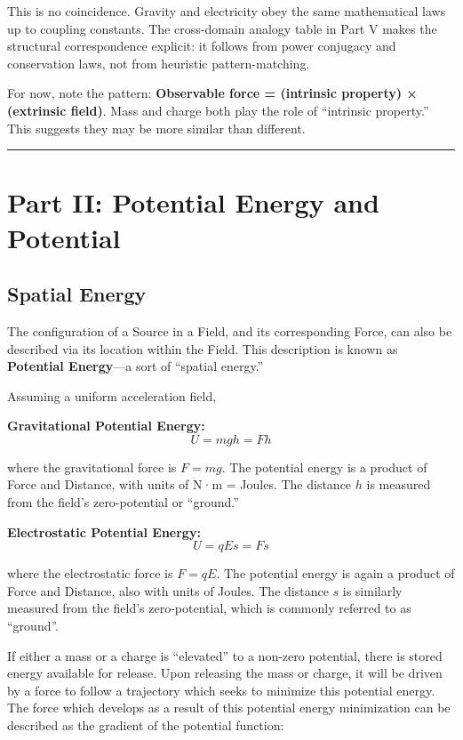 \documentclass[
  letterpaper,
  DIV=11,
  numbers=noendperiod]{scrartcl}
\begin{document}
This is no coincidence. Gravity and electricity obey the same
mathematical laws up to coupling constants. The cross-domain analogy
table in Part V makes the structural correspondence explicit: it follows
from power conjugacy and conservation laws, not from heuristic
pattern-matching.

For now, note the pattern: \textbf{Observable force = (intrinsic
property) × (extrinsic field)}. Mass and charge both play the role of
``intrinsic property.'' This suggests they may be more similar than
different.

\begin{center}\rule{0.5\linewidth}{0.5pt}\end{center}

\section{Part II: Potential Energy and
Potential}\label{part-ii-potential-energy-and-potential}

\subsection{Spatial Energy}\label{spatial-energy}

The configuration of a Source in a Field, and its corresponding Force,
can also be described via its location within the Field. This
description is known as \textbf{Potential Energy}---a sort of ``spatial
energy.''

Assuming a uniform acceleration field,

\textbf{Gravitational Potential Energy:} \[U = mgh = Fh\]

where the gravitational force is \(F = mg\). The potential energy is a
product of Force and Distance, with units of N·m = Joules. The distance
\(h\) is measured from the field's zero-potential or ``ground.''

\textbf{Electrostatic Potential Energy:} \[U = qEs = Fs\]

where the electrostatic force is \(F = qE\). The potential energy is
again a product of Force and Distance, also with units of Joules. The
distance \(s\) is similarly measured from the field's zero-potential,
which is commonly referred to as ``ground''.

If either a mass or a charge is ``elevated'' to a non-zero potential,
there is stored energy available for release. Upon releasing the mass or
charge, it will be driven by a force to follow a trajectory which seeks
to minimize this potential energy. The force which develops as a result
of this potential energy minimization can be described as the gradient
of the potential function:
\end{document}
